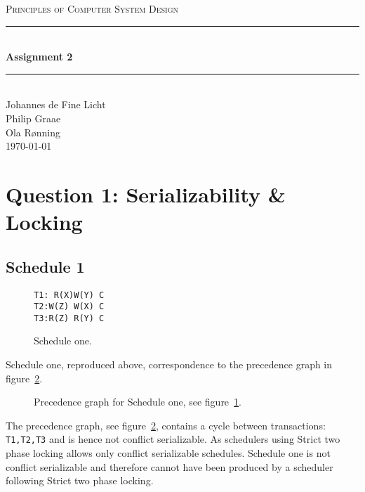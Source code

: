 \documentclass[12pt]{article}
\newcommand{\HRule}{\rule{\linewidth}{0.5mm}}
\begin{document}
\begin{center}
\textsc{\LARGE Principles of Computer System Design}\\[0.3cm] %
\HRule \\[0.4cm]
{ \huge \bfseries Assignment 2} %
\HRule \\[0.4cm]
\large
Johannes de Fine Licht %
\\Philip Graae
\\Ola Rønning
\\\today
\end{center}

\section*{Question 1: Serializability \& Locking} %

\subsection*{Schedule 1}
\begin{figure}[h!]
\texttt{T1: R(X)\hspace{250pt}W(Y) C\\
T2:\hspace{50pt}W(Z) W(X) C \\
T3:\hspace{150pt}R(Z) R(Y) C}
\caption{Schedule one.}
\label{sch1}
\end{figure}
Schedule one, reproduced above, correspondence to the precedence graph in figure~\ref{p1}.
\begin{figure}[h!]
\centering
{}
\caption{Precedence graph for Schedule one, see figure~\ref{sch1}.}
\label{p1}
\end{figure}
The precedence graph, see figure~\ref{p1}, contains a cycle between transactions: \texttt{T1,T2,T3} and is hence not conflict serializable. As schedulers using Strict two phase locking allows only conflict serializable schedules. Schedule one is not conflict serializable and therefore cannot have been produced by a scheduler following Strict two phase locking.
\end{document}
